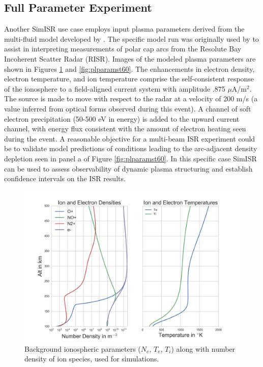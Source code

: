 \subsection{Full Parameter Experiment}
\label{sec:fullparam}
Another SimISR use case employs input plasma parameters derived from the multi-fluid model developed by \citep{semeter:plasmatransport2012}. The specific model run was originally used by \citep{Perry:2015jf} to assist in interpreting measurements of polar cap arcs from the Resolute Bay Incoherent Scatter Radar (RISR). Images of the modeled plasma parameters are shown in Figures \ref{fig:plparamst0} and \ref{fig:plparamst60}. The enhancements in electron density, electron temperature, and ion temperature comprise the self-consistent response of the ionosphere to a field-aligned current system with amplitude .875 $\mu$A/m$^2$.  The source is made to move with respect to the radar at a velocity of 200 m/s (a  value inferred from optical forms observed during this event).  A channel of soft electron precipitation (50-500 eV in energy) is added to the upward current channel, with energy flux consistent with the amount of electron heating seen during the event.  A reasonable objective for a multi-beam ISR experiment could be to validate model predictions of conditions leading to the arc-adjacent density depletion seen in panel a of Figure \ref{fig:plparamst60}.  In this specific case SimISR can be used to assess observability of dynamic plasma structuring and establish confidence intervals on the ISR results.  

\begin{figure}[!t]
\centering
\includegraphics[width=6in]{backgroundallparams}
\caption{Background ionospheric parameters ($N_e$, $T_e$, $T_i$) along with number density of ion species, used for simulations.}
\label{fig:plparamst0}
\end{figure}

